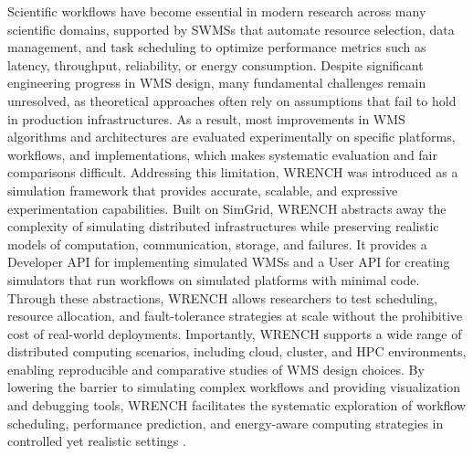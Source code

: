 Scientific workflows have become essential in modern research across many scientific domains, supported by SWMSs that automate resource selection, data management, and task scheduling to optimize performance metrics such as latency, throughput, reliability, or energy consumption. Despite significant engineering progress in WMS design, many fundamental challenges remain unresolved, as theoretical approaches often rely on assumptions that fail to hold in production infrastructures. As a result, most improvements in WMS algorithms and architectures are evaluated experimentally on specific platforms, workflows, and implementations, which makes systematic evaluation and fair comparisons difficult. Addressing this limitation, WRENCH was introduced as a simulation framework that provides accurate, scalable, and expressive experimentation capabilities. Built on SimGrid, WRENCH abstracts away the complexity of simulating distributed infrastructures while preserving realistic models of computation, communication, storage, and failures. It provides a Developer API for implementing simulated WMSs and a User API for creating simulators that run workflows on simulated platforms with minimal code. Through these abstractions, WRENCH allows researchers to test scheduling, resource allocation, and fault-tolerance strategies at scale without the prohibitive cost of real-world deployments. Importantly, WRENCH supports a wide range of distributed computing scenarios, including cloud, cluster, and HPC environments, enabling reproducible and comparative studies of WMS design choices. By lowering the barrier to simulating complex workflows and providing visualization and debugging tools, WRENCH facilitates the systematic exploration of workflow scheduling, performance prediction, and energy-aware computing strategies in controlled yet realistic settings \cite{wrench}.






